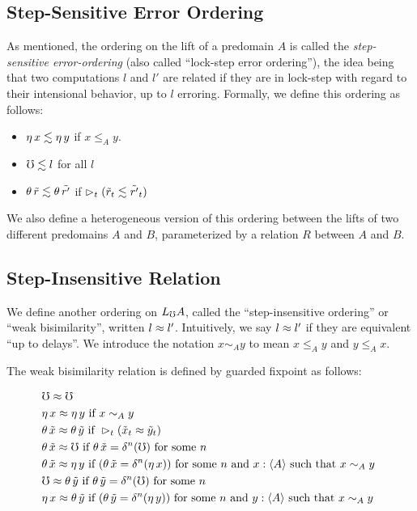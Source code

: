\subsection{Step-Sensitive Error Ordering}\label{subsec:lock-step}

As mentioned, the ordering on the lift of a predomain $A$ is called the
\emph{step-sensitive error-ordering} (also called ``lock-step error ordering''),
the idea being that two computations $l$ and $l'$ are related if they are in
lock-step with regard to their intensional behavior, up to $l$ erroring.
Formally, we define this ordering as follows:

\begin{itemize}
  \item 	$\eta\, x \lesssim \eta\, y$ if $x \le_A y$.
  \item 	$\mho \lesssim l$ for all $l$ 
  \item   $\theta\, \tilde{r} \lesssim \theta\, \tilde{r'}$ if
          $\vartriangleright_t (\tilde{r}_t \lesssim \tilde{r'}_t)$
\end{itemize}

We also define a heterogeneous version of this ordering between the lifts of two
different predomains $A$ and $B$, parameterized by a relation $R$ between $A$ and $B$.

\subsection{Step-Insensitive Relation}

We define another ordering on $L_\mho A$, called the ``step-insensitive ordering'' or
``weak bisimilarity'', written $l \approx l'$.
Intuitively, we say $l \approx l'$ if they are equivalent ``up to delays''.
We introduce the notation $x \sim_A y$ to mean $x \le_A y$ and $y \le_A x$.

The weak bisimilarity relation is defined by guarded fixpoint as follows:

\begin{align*}
  &\mho \bisim \mho \\
%
  &\eta\, x \bisim \eta\, y \text{ if } 
    x \sim_A y \\
%		
  &\theta\, \tilde{x} \bisim \theta\, \tilde{y} \text{ if } 
    \later_t (\tilde{x}_t \bisim \tilde{y}_t) \\
%	
  &\theta\, \tilde{x} \bisim \mho \text{ if } 
    \theta\, \tilde{x} = \delta^n(\mho) \text { for some $n$ } \\
%	
  &\theta\, \tilde{x} \bisim \eta\, y \text{ if }
    (\theta\, \tilde{x} = \delta^n(\eta\, x))
  \text { for some $n$ and $x : \ty{A}$ such that $x \sim_A y$ } \\
%
  &\mho \bisim \theta\, \tilde{y} \text { if } 
    \theta\, \tilde{y} = \delta^n(\mho) \text { for some $n$ } \\
%	
  &\eta\, x \bisim \theta\, \tilde{y} \text { if }
    (\theta\, \tilde{y} = \delta^n (\eta\, y))
  \text { for some $n$ and $y : \ty{A}$ such that $x \sim_A y$ }
\end{align*}

